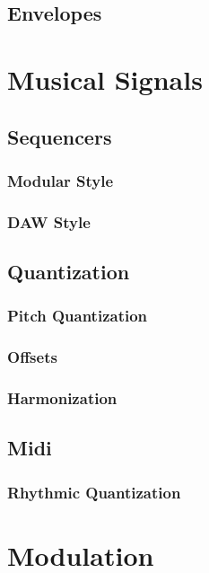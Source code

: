 \documentclass[11pt]{article}
\begin{document}
\subsection{Envelopes}
\label{sec:org7d91b7e}


\section{Musical Signals}
\label{sec:orgcd94544}
\subsection{Sequencers}
\label{sec:orgea6602b}
\subsubsection{Modular Style}
\label{sec:orgbcef44c}
\subsubsection{DAW Style}
\label{sec:orgb2ea4d9}
\subsection{Quantization}
\label{sec:org0b39c33}
\subsubsection{Pitch Quantization}
\label{sec:orga2d8117}
\subsubsection{Offsets}
\label{sec:orgcc9b219}
\subsubsection{Harmonization}
\label{sec:orgdab15de}
\subsection{Midi}
\label{sec:org2ea681d}
\subsubsection{Rhythmic Quantization}
\label{sec:org62c0e36}

\section{Modulation}
\label{sec:org3b363fe}
\end{document}
